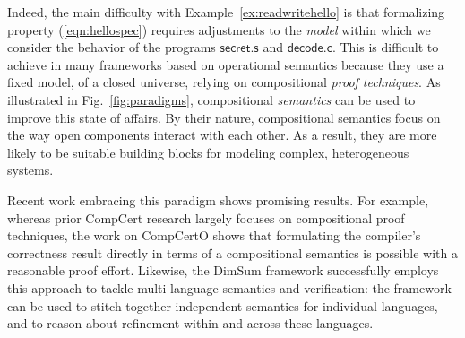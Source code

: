 \documentclass[acmsmall,screen,review,nonacm]{acmart}
\newcommand{\kw}[1]{\ensuremath{ \mathsf{#1} }}
\begin{document}
Indeed,
the main difficulty with Example~\ref{ex:readwritehello}
is that formalizing property (\ref{eqn:hellospec})
requires adjustments to the \emph{model}
within which we consider the behavior of
the programs \kw{secret.s} and \kw{decode.c}.
This is difficult to achieve
in many frameworks based on operational semantics
because they use a fixed model, of a closed universe,
relying on compositional \emph{proof techniques}.
%
As illustrated in Fig.~\ref{fig:paradigms},
compositional \emph{semantics} can be used to improve
this state of affairs.
By their nature,
compositional semantics focus on
the way
open components
interact with each other.
As a result,
they are more likely to be suitable
building blocks for
modeling complex, heterogeneous systems.

Recent work embracing this paradigm shows promising results.
For example,
whereas prior CompCert research
largely focuses on compositional proof techniques,
the work on CompCertO \cite{compcerto}
shows that formulating the compiler's correctness result
directly in terms of a compositional semantics
is possible with a reasonable proof effort.
Likewise,
the DimSum framework \cite{dimsum}
successfully employs this approach to tackle
multi-language semantics and verification:
the framework can be used to stitch together
independent semantics for individual languages,
and to reason about refinement within and across
these languages.

%
\end{document}
